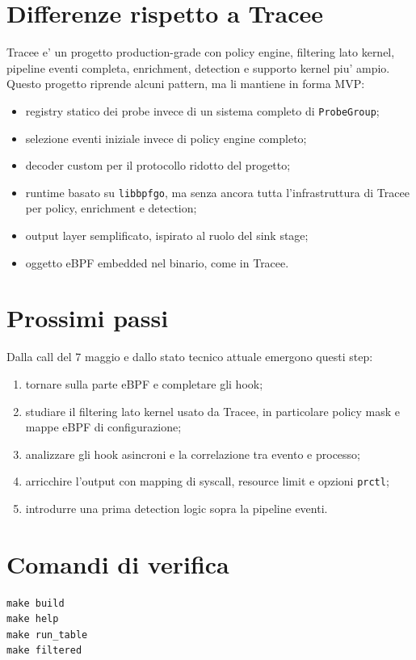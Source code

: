 \documentclass[11pt,a4paper]{article}
\begin{document}
\section{Differenze rispetto a Tracee}

Tracee e' un progetto production-grade con policy engine, filtering lato kernel,
pipeline eventi completa, enrichment, detection e supporto kernel piu' ampio.
Questo progetto riprende alcuni pattern, ma li mantiene in forma MVP:

\begin{itemize}
  \item registry statico dei probe invece di un sistema completo di
  \texttt{ProbeGroup};
  \item selezione eventi iniziale invece di policy engine completo;
  \item decoder custom per il protocollo ridotto del progetto;
  \item runtime basato su \texttt{libbpfgo}, ma senza ancora tutta
  l'infrastruttura di Tracee per policy, enrichment e detection;
  \item output layer semplificato, ispirato al ruolo del sink stage;
  \item oggetto eBPF embedded nel binario, come in Tracee.
\end{itemize}

\section{Prossimi passi}

Dalla call del 7 maggio e dallo stato tecnico attuale emergono questi step:

\begin{enumerate}
  \item tornare sulla parte eBPF e completare gli hook;
  \item studiare il filtering lato kernel usato da Tracee, in particolare policy
  mask e mappe eBPF di configurazione;
  \item analizzare gli hook asincroni e la correlazione tra evento e processo;
  \item arricchire l'output con mapping di syscall, resource limit e opzioni
  \texttt{prctl};
  \item introdurre una prima detection logic sopra la pipeline eventi.
\end{enumerate}

\section{Comandi di verifica}

\begin{lstlisting}[style=terminal]
make build
make help
make run_table
make filtered
\end{lstlisting}
\end{document}
